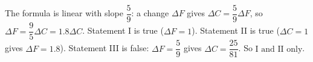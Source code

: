The formula is linear with slope $\dfrac{5}{9}$: a change $\Delta F$ gives $\Delta C=\dfrac{5}{9}\Delta F$, so $\Delta F=\dfrac{9}{5}\Delta C=1.8\Delta C$. Statement I is true ($\Delta F=1$). Statement II is true ($\Delta C=1$ gives $\Delta F=1.8$). Statement III is false: $\Delta F=\dfrac{5}{9}$ gives $\Delta C=\dfrac{25}{81}$. So $\boxed{\text{I and II only}}$.
